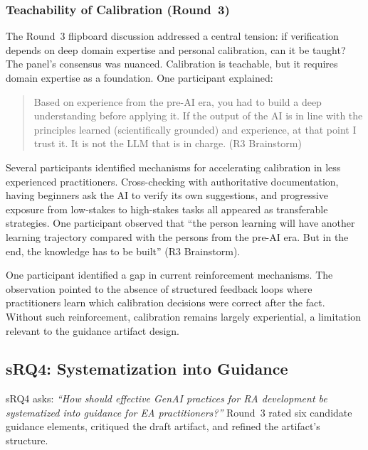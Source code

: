 \subsubsection{Teachability of Calibration (Round~3)}\label{subsubsec:teachability}

The Round~3 flipboard discussion addressed a central tension: if verification
depends on deep domain expertise and personal calibration, can it be taught? The
panel's consensus was nuanced. Calibration is teachable, but it requires domain
expertise as a foundation. One participant explained:

\begin{quote}
Based on experience from the pre-AI era, you had to build a deep understanding
before applying it. If the output of the AI is in line with the principles
learned (scientifically grounded) and experience, at that point I trust it. It
is not the LLM that is in charge. (R3 Brainstorm)
\end{quote}

Several participants identified mechanisms for accelerating calibration in less
experienced practitioners. Cross-checking with authoritative documentation,
having beginners ask the AI to verify its own suggestions, and progressive
exposure from low-stakes to high-stakes tasks all appeared as transferable
strategies. One participant observed that ``the person learning will have another
learning trajectory compared with the persons from the pre-AI era. But in the
end, the knowledge has to be built'' (R3 Brainstorm).

One participant identified a gap in current reinforcement mechanisms. The
observation pointed to the absence of structured feedback loops where
practitioners learn which calibration decisions were correct after the fact.
Without such reinforcement, calibration remains largely experiential, a
limitation relevant to the guidance artifact design.


\subsection{sRQ4: Systematization into Guidance}\label{subsec:srq4}

sRQ4 asks: \textit{``How should effective GenAI practices for RA development be
systematized into guidance for EA practitioners?''} Round~3 rated six candidate
guidance elements, critiqued the draft artifact, and refined the artifact's
structure.

